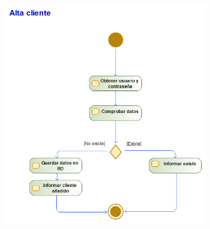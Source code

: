 \begin{figure}[H]
    \centering
    \includegraphics[width=0.8\textwidth]{Use_Cases/alta_cliente.png}
\end{figure}
\newpage
